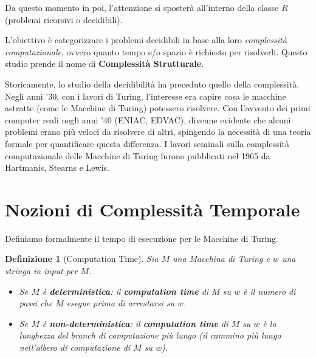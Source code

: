 \documentclass[a4paper, 11pt]{book} %
\newtheorem{definition}[theorem]{Definizione}
\theoremstyle{definition}
\begin{document}
Da questo momento in poi, l'attenzione si sposterà all'interno della classe $R$ (problemi ricorsivi o decidibili).
\begin{center}
\end{center}
L'obiettivo è categorizzare i problemi decidibili in base alla loro \emph{complessità computazionale}, ovvero quanto tempo e/o spazio è richiesto per risolverli. Questo studio prende il nome di \textbf{Complessità Strutturale}.

Storicamente, lo studio della decidibilità ha preceduto quello della complessità. Negli anni '30, con i lavori di Turing, l'interesse era capire cosa le macchine astratte (come le Macchine di Turing) potessero risolvere. Con l'avvento dei primi computer reali negli anni '40 (ENIAC, EDVAC), divenne evidente che alcuni problemi erano più veloci da risolvere di altri, spingendo la necessità di una teoria formale per quantificare questa differenza.
I lavori seminali sulla complessità computazionale delle Macchine di Turing furono pubblicati nel 1965 da Hartmanis, Stearns e Lewis.

\section{Nozioni di Complessità Temporale}

Definiamo formalmente il tempo di esecuzione per le Macchine di Turing.

\begin{definition}[Computation Time]
Sia $M$ una Macchina di Turing e $w$ una stringa in input per $M$.
\begin{itemize}
    \item Se $M$ è \textbf{deterministica}: il \textbf{computation time} di $M$ su $w$ è il numero di passi che $M$ esegue prima di arrestarsi su $w$.
    \item Se $M$ è \textbf{non-deterministica}: il \textbf{computation time} di $M$ su $w$ è la lunghezza del \emph{branch di computazione più lungo} (il cammino più lungo nell'albero di computazione di $M$ su $w$).
\end{itemize}
\end{definition}
\end{document}
